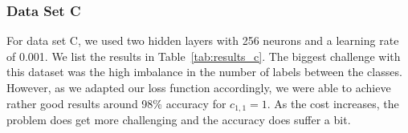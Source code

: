 \documentclass[acmsmall,nonacm]{acmart}
\begin{document}
\subsubsection*{Data Set C}
For data set C, we used two hidden layers with 256 neurons and a learning rate of 0.001. We list the results in Table~\ref{tab:results_c}. The biggest challenge with this dataset was the high imbalance in the number of labels between the classes. However, as we adapted our loss function accordingly, we were able to achieve rather good results around 98\% accuracy for $c_{1, 1} = 1$. As the cost increases, the problem does get more challenging and the accuracy does suffer a bit. 

\begin{table}[H]
\end{table}
\end{document}
